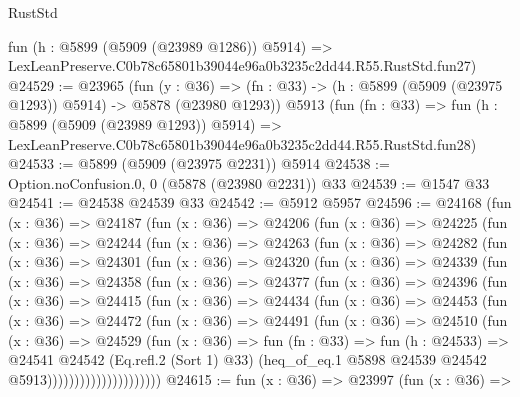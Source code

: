 \begin{lexlean}{RustStd}
\begin{coremodule}
{{    fun (h : @5899 (@5909 (@23989 @1286)) @5914) =>
    LexLeanPreserve.C0b78c65801b39044e96a0b3235c2dd44.R55.RustStd.fun27)
@24529 := @23965
    (fun (y : @36) =>
    (fn : @33) -> (h : @5899 (@5909 (@23975 @1293)) @5914) -> @5878 (@23980 @1293))
    @5913
    (fun (fn : @33) =>
    fun (h : @5899 (@5909 (@23989 @1293)) @5914) =>
    LexLeanPreserve.C0b78c65801b39044e96a0b3235c2dd44.R55.RustStd.fun28)
@24533 := @5899 (@5909 (@23975 @2231)) @5914
@24538 := Option.noConfusion.{0, 0} (@5878 (@23980 @2231)) @33
@24539 := @1547 @33
@24541 := @24538 @24539 @33
@24542 := @5912 @5957
@24596 := @24168
    (fun (x : @36) =>
    @24187
      (fun (x : @36) =>
      @24206
        (fun (x : @36) =>
        @24225
          (fun (x : @36) =>
          @24244
            (fun (x : @36) =>
            @24263
              (fun (x : @36) =>
              @24282
                (fun (x : @36) =>
                @24301
                  (fun (x : @36) =>
                  @24320
                    (fun (x : @36) =>
                    @24339
                      (fun (x : @36) =>
                      @24358
                        (fun (x : @36) =>
                        @24377
                          (fun (x : @36) =>
                          @24396
                            (fun (x : @36) =>
                            @24415
                              (fun (x : @36) =>
                              @24434
                                (fun (x : @36) =>
                                @24453
                                  (fun (x : @36) =>
                                  @24472
                                    (fun (x : @36) =>
                                    @24491
                                      (fun (x : @36) =>
                                      @24510
                                        (fun (x : @36) =>
                                        @24529
                                          (fun (x : @36) =>
                                          fun (fn : @33) =>
                                          fun (h : @24533) =>
                                          @24541
                                            @24542
                                            (Eq.refl.{2} (Sort 1) @33)
                                            (heq_of_eq.{1}
                                              @5898
                                              @24539
                                              @24542
                                              @5913)))))))))))))))))))))
@24615 := fun (x : @36) =>
  @23997
    (fun (x : @36) =>
}}
\end{coremodule}
\end{lexlean}
